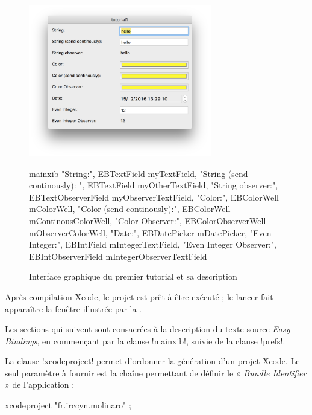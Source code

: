 \begin{figure}[t]
  \centering
  \includegraphics[width=8cm]{chapitres/tutorial1.png}
  \small
\begin{ebcode}
mainxib {
  {"String:", EBTextField myTextField},
  {"String (send continously): ", EBTextField myOtherTextField},
  {"String observer:", EBTextObserverField myObserverTextField},
  {"Color:", EBColorWell mColorWell},
  {"Color (send continously):", EBColorWell mContinousColorWell},
  {"Color Observer:", EBColorObserverWell mObserverColorWell},
  {"Date:", EBDatePicker mDatePicker},
  {"Even Integer:", EBIntField mIntegerTextField},
  {"Even Integer Observer:", EBIntObserverField mIntegerObserverTextField}
}
\end{ebcode}
  \caption{Interface graphique du premier tutorial et sa description}
  \ligne
\end{figure}

Après compilation Xcode, le projet est prêt à être exécuté ; le lancer fait apparaître la fenêtre illustrée par la .

Les sections qui suivent sont consacrées à la description du texte source \emph{Easy Bindings}, en commençant par la clause \eb!mainxib!, suivie de la clause \eb!prefs!.








La clause \eb!xcodeproject! permet d'ordonner la génération d'un projet Xcode. Le seul paramètre à fournir est la chaîne permettant de définir le « \emph{Bundle Identifier} » de l'application :
\begin{ebcode}
xcodeproject "fr.irccyn.molinaro" ;
\end{ebcode}

